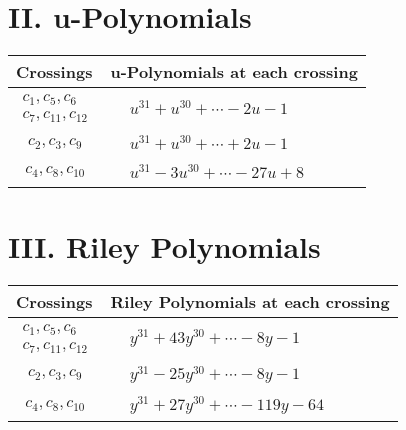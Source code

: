 \documentclass[1p]{elsarticle_modified}
\theoremstyle{definition}
\begin{document}
\newpage\renewcommand{\arraystretch}{1}
\centering \section*{ II. u-Polynomials}
\begin{tabular}{m{50pt}|m{274pt}}
Crossings & \hspace{64pt}u-Polynomials at each crossing \\
\hline $$\begin{aligned}c_{1},c_{5},c_{6}\\c_{7},c_{11},c_{12}\end{aligned}$$&$\begin{aligned}
&u^{31}+u^{30}+\cdots-2 u-1
\end{aligned}$\\
\hline $$\begin{aligned}c_{2},c_{3},c_{9}\end{aligned}$$&$\begin{aligned}
&u^{31}+u^{30}+\cdots+2 u-1
\end{aligned}$\\
\hline $$\begin{aligned}c_{4},c_{8},c_{10}\end{aligned}$$&$\begin{aligned}
&u^{31}-3 u^{30}+\cdots-27 u+8
\end{aligned}$\\
\hline
\end{tabular}\newpage\renewcommand{\arraystretch}{1}
\centering \section*{ III. Riley Polynomials}
\begin{tabular}{m{50pt}|m{274pt}}
Crossings & \hspace{64pt}Riley Polynomials at each crossing \\
\hline $$\begin{aligned}c_{1},c_{5},c_{6}\\c_{7},c_{11},c_{12}\end{aligned}$$&$\begin{aligned}
&y^{31}+43 y^{30}+\cdots-8 y-1
\end{aligned}$\\
\hline $$\begin{aligned}c_{2},c_{3},c_{9}\end{aligned}$$&$\begin{aligned}
&y^{31}-25 y^{30}+\cdots-8 y-1
\end{aligned}$\\
\hline $$\begin{aligned}c_{4},c_{8},c_{10}\end{aligned}$$&$\begin{aligned}
&y^{31}+27 y^{30}+\cdots-119 y-64
\end{aligned}$\\
\hline
\end{tabular}
\vskip 2pc
\end{document}

